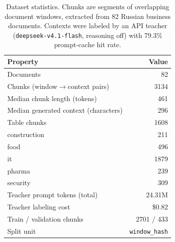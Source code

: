 \begin{table}[t]
\centering
\small
\caption{Dataset statistics. Chunks are segments of overlapping document windows, extracted from 82 Russian business documents. Contexts were labeled by an API teacher (\texttt{deepseek-v4.1-flash}, reasoning off) with 79.3\% prompt-cache hit rate.}
\label{tab:dataset}
\begin{tabular}{lr}
\toprule
Property & Value \\
\midrule
Documents & 82 \\
Chunks (window$\rightarrow$context pairs) & 3134 \\
Median chunk length (tokens) & 461 \\
Median generated context (characters) & 296 \\
Table chunks & 1608 \\
\midrule
\quad construction & 211 \\
\quad food & 496 \\
\quad it & 1879 \\
\quad pharma & 239 \\
\quad security & 309 \\
\midrule
Teacher prompt tokens (total) & 24.31M \\
Teacher labeling cost & \$0.82 \\
\midrule
Train / validation chunks & 2701 / 433 \\
Split unit & \texttt{window\_hash} \\
\bottomrule
\end{tabular}
\end{table}
